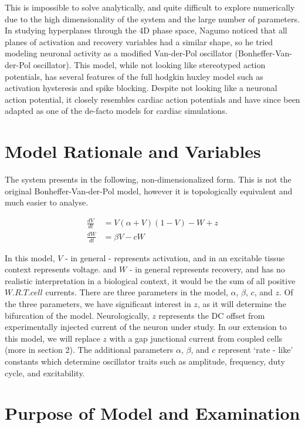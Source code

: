 \documentclass[11pt]{report}
\begin{document}
This is impossible to solve analytically, and quite difficult to explore numerically due to the high dimensionality of the system and the large number of parameters. In studying hyperplanes through the 4D phase space, Nagumo noticed that all planes of activation and recovery variables had a similar shape, so he tried modeling neuronal activity as a modified Van-der-Pol oscillator (Bonheffer-Van-der-Pol oscillator). This model, while not looking like stereotyped action potentials, has several features of the full hodgkin huxley model such as activation hysteresis and spike blocking. Despite not looking like a neuronal action potential, it closely resembles cardiac action potentials and have since been adapted as one of the de-facto models for cardiac simulations. 


\section{Model Rationale and Variables}

The system presents in the following, non-dimensionalized form. This is not the original Bonheffer-Van-der-Pol model, however it is topologically equivalent and much easier to analyse.

\begin{align} \frac{dV}{dt} &= V(\alpha+V)(1-V) -W + z \\
\frac{dW}{dt} &= \beta V-cW \end{align}

In this model, $V$ - in general - represents activation, and in an excitable tissue context represents voltage. and $W$ - in general represents recovery, and has no realistic interpretation in a biological context, it would be the sum of all positive \( W.R.T. cell \) currents. There are three parameters in the model, $\alpha$, $\beta$, $c$, and $z$. Of the three parameters, we have significant interest in $z$, as it will determine the bifurcation of the model. Neurologically, $z$ represents the DC offset from experimentally injected current of the neuron under study. In our extension to this model, we will replace $z$ with a gap junctional current from coupled cells (more in section 2). The additional parameters $\alpha$, $\beta$, and $c$ represent `rate - like' constants which determine oscillator traits such as amplitude, frequency, duty cycle, and excitability.


\section{Purpose of Model and Examination}
\end{document}
